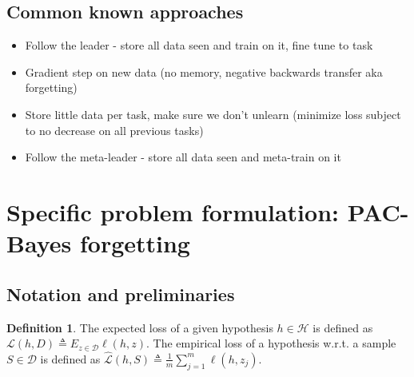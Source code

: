 \documentclass[letterpaper]{article}
\theoremstyle{definition}
\newtheorem{defn}{Definition}[section]
\begin{document}
\subsection{Common known approaches}
\begin{itemize}
	\item Follow the leader - store all data seen and train on it, fine tune to task
	\item Gradient step on new data (no memory, negative backwards transfer aka forgetting)
	\item Store little data per task, make sure we don't unlearn (minimize loss subject to no decrease on all previous tasks)
	\item Follow the meta-leader - store all data seen and meta-train on it
\end{itemize}

\section{Specific problem formulation: PAC-Bayes forgetting}
	
\subsection{Notation and preliminaries}

\begin{defn}
	The expected loss of a given hypothesis $h\in \mathcal{H}$ is defined as $\mathcal{L}(h, D) \triangleq E_{z\in \mathcal{D}} \ell(h, z)$. The empirical loss of a hypothesis w.\!r.\!t.\! a sample $S\in \mathcal{D}$ is defined as $\hat{\mathcal{L}}(h, S) \triangleq \frac{1}{m}\sum_{j=1}^{m}\ell(h, z_j)$.
\end{defn}




\clearpage


\end{document}

